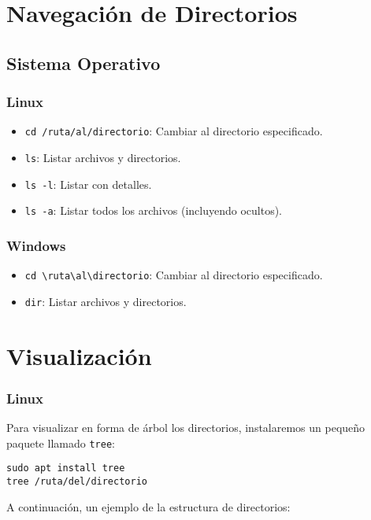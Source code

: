 
\section{Navegación de Directorios}

\subsection*{Sistema Operativo}

\subsubsection*{Linux}
\begin{itemize}
    \item \texttt{cd /ruta/al/directorio}: Cambiar al directorio especificado.
    \item \texttt{ls}: Listar archivos y directorios.
    \item \texttt{ls -l}: Listar con detalles.
    \item \texttt{ls -a}: Listar todos los archivos (incluyendo ocultos).
\end{itemize}

\subsubsection*{Windows}
\begin{itemize}
    \item \texttt{cd \textbackslash ruta\textbackslash al\textbackslash directorio}: Cambiar al directorio especificado.
    \item \texttt{dir}: Listar archivos y directorios.
\end{itemize}

\section*{Visualización}

\subsubsection*{Linux}
Para visualizar en forma de árbol los directorios, instalaremos un pequeño paquete llamado \texttt{tree}:

\begin{verbatim}
sudo apt install tree
tree /ruta/del/directorio
\end{verbatim}

A continuación, un ejemplo de la estructura de directorios:

